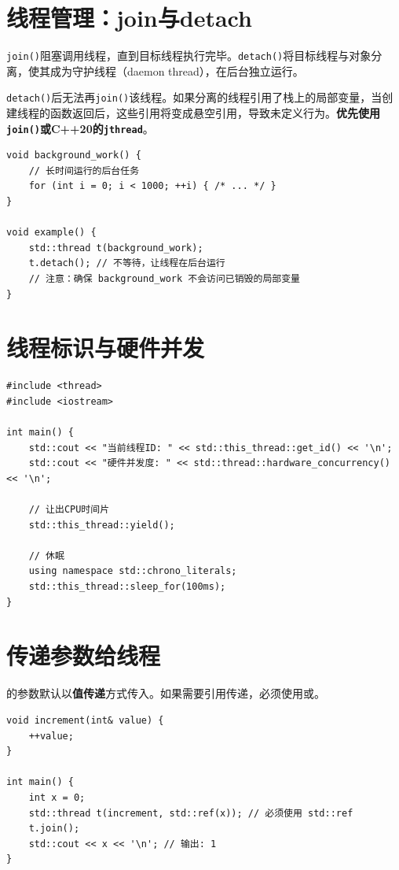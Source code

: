 \documentclass[12pt,a4paper,fontset=fandol]{ctexbook}
\newcommand{\cpp}[1]{C++#1}
\begin{document}
\section{线程管理：join与detach}

\texttt{join()}阻塞调用线程，直到目标线程执行完毕。\texttt{detach()}将目标线程与\texttt{}对象分离，使其成为守护线程（daemon thread），在后台独立运行。

\begin{warning}
\texttt{detach()}后无法再\texttt{join()}该线程。如果分离的线程引用了栈上的局部变量，当创建线程的函数返回后，这些引用将变成悬空引用，导致未定义行为。\textbf{优先使用\texttt{join()}或\cpp{}20的\texttt{jthread}}。
\end{warning}

\begin{lstlisting}
void background_work() {
    // 长时间运行的后台任务
    for (int i = 0; i < 1000; ++i) { /* ... */ }
}

void example() {
    std::thread t(background_work);
    t.detach(); // 不等待，让线程在后台运行
    // 注意：确保 background_work 不会访问已销毁的局部变量
}
\end{lstlisting}

\section{线程标识与硬件并发}

\begin{lstlisting}
#include <thread>
#include <iostream>

int main() {
    std::cout << "当前线程ID: " << std::this_thread::get_id() << '\n';
    std::cout << "硬件并发度: " << std::thread::hardware_concurrency() << '\n';

    // 让出CPU时间片
    std::this_thread::yield();

    // 休眠
    using namespace std::chrono_literals;
    std::this_thread::sleep_for(100ms);
}
\end{lstlisting}

\section{传递参数给线程}

\texttt{}的参数默认以\textbf{值传递}方式传入。如果需要引用传递，\allowbreak{}必须使用\texttt{}或\texttt{}。

\begin{lstlisting}
void increment(int& value) {
    ++value;
}

int main() {
    int x = 0;
    std::thread t(increment, std::ref(x)); // 必须使用 std::ref
    t.join();
    std::cout << x << '\n'; // 输出: 1
}
\end{lstlisting}
\end{document}
